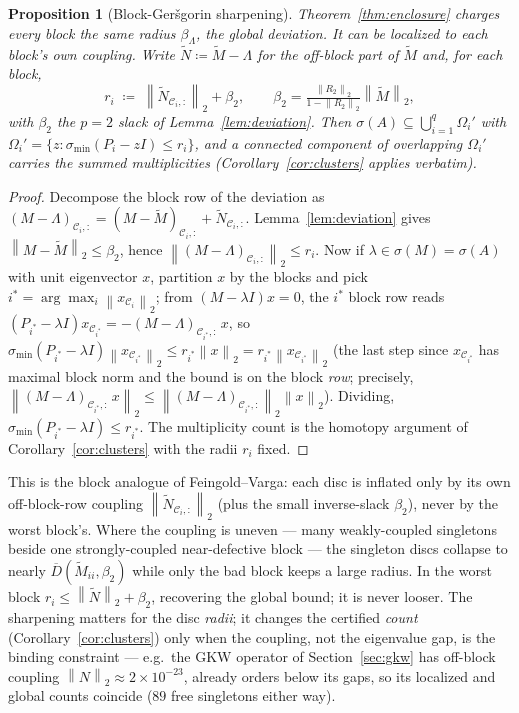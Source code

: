 \documentclass[11pt,a4paper]{article}
\newcommand{\norm}[1]{\left\|#1\right\|}
\newcommand{\spec}{\sigma}
\theoremstyle{plain}
\newtheorem{proposition}[theorem]{Proposition}
\theoremstyle{definition}
\begin{document}
\begin{proposition}[Block-Ger\v sgorin sharpening]\label{prop:blockgersg}
Theorem~\ref{thm:enclosure} charges every block the \emph{same} radius $\beta_\Lambda$,
the global deviation. It can be localized to each block's \emph{own} coupling. Write
$\widetilde N\coloneqq\widetilde M-\Lambda$ for the off-block part of $\widetilde M$ and, for
each block,
\begin{equation}\label{eq:blockrad}
  r_i\;\coloneqq\;\norm{\widetilde N_{\mathcal C_i,:}}_2+\beta_2,
  \qquad \beta_2=\tfrac{\norm{R_2}_2}{1-\norm{R_2}_2}\norm{\widetilde M}_2 ,
\end{equation}
with $\beta_2$ the $p=2$ slack of Lemma~\ref{lem:deviation}. Then
$\spec(A)\subseteq\bigcup_{i=1}^{q}\Omega_i'$ with
$\Omega_i'=\{z:\sigma_{\min}(P_i-zI)\le r_i\}$, and a connected component of overlapping
$\Omega_i'$ carries the summed multiplicities (Corollary~\ref{cor:clusters} applies verbatim).
\end{proposition}

\begin{proof}
Decompose the block row of the deviation as
$(M-\Lambda)_{\mathcal C_i,:}=(M-\widetilde M)_{\mathcal C_i,:}+\widetilde N_{\mathcal C_i,:}$.
Lemma~\ref{lem:deviation} gives $\norm{M-\widetilde M}_2\le\beta_2$, hence
$\norm{(M-\Lambda)_{\mathcal C_i,:}}_2\le r_i$. Now if $\lambda\in\spec(M)=\spec(A)$ with unit
eigenvector $x$, partition $x$ by the blocks and pick $i^\ast=\arg\max_i\norm{x_{\mathcal C_i}}_2$;
from $(M-\lambda I)x=0$, the $i^\ast$ block row reads
$(P_{i^\ast}-\lambda I)x_{\mathcal C_{i^\ast}}=-(M-\Lambda)_{\mathcal C_{i^\ast},:}\,x$, so
$\sigma_{\min}(P_{i^\ast}-\lambda I)\norm{x_{\mathcal C_{i^\ast}}}_2\le r_{i^\ast}\norm{x}_2
=r_{i^\ast}\norm{x_{\mathcal C_{i^\ast}}}_2$ (the last step since $x_{\mathcal C_{i^\ast}}$ has
maximal block norm and the bound is on the block \emph{row}; precisely,
$\norm{(M-\Lambda)_{\mathcal C_{i^\ast},:}\,x}_2\le\norm{(M-\Lambda)_{\mathcal C_{i^\ast},:}}_2\norm{x}_2$).
Dividing, $\sigma_{\min}(P_{i^\ast}-\lambda I)\le r_{i^\ast}$. The multiplicity count is the
homotopy argument of Corollary~\ref{cor:clusters} with the radii $r_i$ fixed.
\end{proof}

This is the block analogue of Feingold--Varga: each disc is inflated only by its own
off-block-row coupling $\norm{\widetilde N_{\mathcal C_i,:}}_2$ (plus the small inverse-slack
$\beta_2$), never by the worst block's. Where the coupling is uneven --- many weakly-coupled
singletons beside one strongly-coupled near-defective block --- the singleton discs collapse
to nearly $\overline D(\widetilde M_{ii},\beta_2)$ while only the bad block keeps a large
radius. In the worst block $r_i\le\norm{\widetilde N}_2+\beta_2$, recovering the global bound;
it is never looser. The sharpening matters for the disc \emph{radii}; it changes the certified
\emph{count} (Corollary~\ref{cor:clusters}) only when the coupling, not the eigenvalue gap, is
the binding constraint --- e.g.\ the GKW operator of Section~\ref{sec:gkw} has off-block
coupling $\norm{N}_2\approx2\times10^{-23}$, already orders below its gaps, so its localized
and global counts coincide ($89$ free singletons either way).
\end{document}
